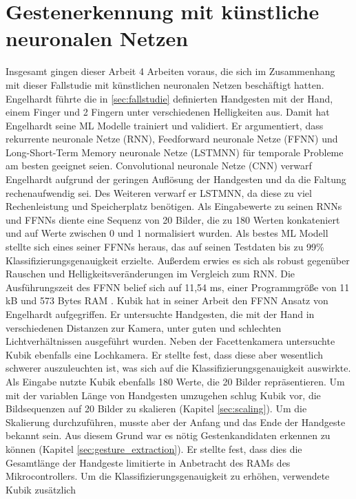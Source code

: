 \section{Gestenerkennung mit künstliche neuronalen Netzen}
Insgesamt gingen dieser Arbeit 4 Arbeiten voraus, die sich im Zusammenhang mit dieser Fallstudie mit künstlichen neuronalen Netzen beschäftigt hatten.
\newline
\newline
Engelhardt führte die in \ref{sec:fallstudie} definierten Handgesten mit der Hand, einem Finger und 2 Fingern unter verschiedenen Helligkeiten aus. Damit hat Engelhardt seine ML Modelle trainiert und validiert. Er
argumentiert, dass rekurrente neuronale Netze (RNN), Feedforward neuronale Netze (FFNN) und Long-Short-Term Memory neuronale Netze (LSTMNN) für temporale Probleme am besten geeignet seien. Convolutional neuronale
Netze (CNN) verwarf Engelhardt aufgrund der geringen Auflösung der Handgesten und da die Faltung rechenaufwendig sei. Des Weiteren verwarf er LSTMNN, da diese zu viel Rechenleistung und Speicherplatz
benötigen. Als Eingabewerte zu seinen RNNs und FFNNs diente eine Sequenz von 20 Bilder, die zu 180 Werten konkateniert und auf Werte zwischen 0 und 1 normalisiert wurden. Als bestes ML Modell stellte sich eines
seiner FFNNs heraus, das auf seinen Testdaten bis zu 99\% Klassifizierungsgenauigkeit erzielte. Außerdem erwies es sich als robust gegenüber Rauschen und Helligkeitsveränderungen im Vergleich zum RNN. Die Ausführungszeit
des FFNN belief sich auf 11,54 ms, einer Programmgröße von 11 kB und 573 Bytes RAM \cite{engelhardtThesis}.
\newline
\newline
Kubik hat in seiner Arbeit den FFNN Ansatz von Engelhardt aufgegriffen. Er untersuchte Handgesten, die mit der Hand in verschiedenen Distanzen zur Kamera, unter guten und schlechten Lichtverhältnissen ausgeführt wurden.
Neben der Facettenkamera untersuchte Kubik ebenfalls eine Lochkamera. Er stellte fest, dass diese aber wesentlich schwerer auszuleuchten ist, was sich auf die
Klassifizierungsgenauigkeit auswirkte. Als Eingabe nutzte Kubik ebenfalls 180 Werte, die 20 Bilder repräsentieren. Um mit der variablen Länge von Handgesten umzugehen schlug Kubik vor, die Bildsequenzen auf 20 Bilder zu
skalieren (Kapitel \ref{sec:scaling}). Um die Skalierung durchzuführen, musste aber der Anfang und das Ende der Handgeste bekannt sein. Aus diesem Grund war es nötig Gestenkandidaten erkennen zu können (Kapitel
\ref{sec:gesture_extraction}). Er stellte fest, dass dies die Gesamtlänge der Handgeste limitierte in Anbetracht des RAMs des Mikrocontrollers. Um die Klassifizierungsgenauigkeit zu erhöhen, verwendete Kubik zusätzlich
